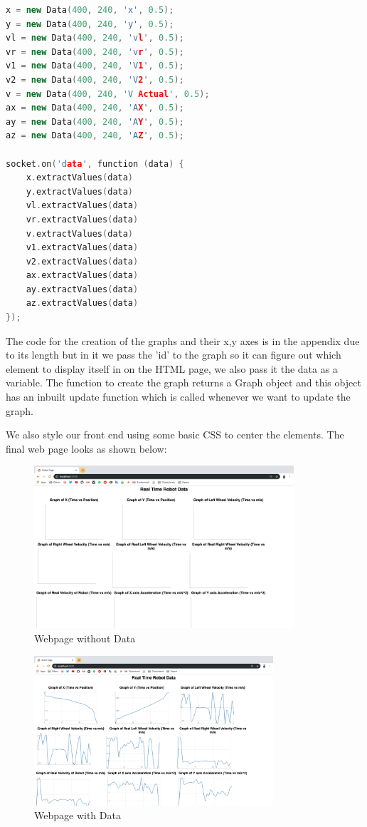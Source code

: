 \documentclass[conference]{IEEEtran}
\begin{document}
\begin{lstlisting}[language=C++, caption=Front End Data Listener]
x = new Data(400, 240, 'x', 0.5);
y = new Data(400, 240, 'y', 0.5);
vl = new Data(400, 240, 'vl', 0.5);
vr = new Data(400, 240, 'vr', 0.5);
v1 = new Data(400, 240, 'V1', 0.5);
v2 = new Data(400, 240, 'V2', 0.5);
v = new Data(400, 240, 'V Actual', 0.5);
ax = new Data(400, 240, 'AX', 0.5);
ay = new Data(400, 240, 'AY', 0.5);
az = new Data(400, 240, 'AZ', 0.5);

socket.on('data', function (data) {
    x.extractValues(data)
    y.extractValues(data)
    vl.extractValues(data)
    vr.extractValues(data)
    v.extractValues(data)
    v1.extractValues(data)
    v2.extractValues(data)
    ax.extractValues(data)
    ay.extractValues(data)
    az.extractValues(data)
});\end{lstlisting}

    The code for the creation of the graphs and their x,y axes is in the appendix due to its length but in it we pass the
    'id' to the graph so it can figure out which element to display itself in on the HTML page, we also pass it the data as a
    variable. The function to create the graph returns a Graph object and this object has an inbuilt update function which is called
    whenever we want to update the graph.

    We also style our front end using some basic CSS to center the elements. The final web page looks as shown below:

    \begin{figure}[H]
        \centering
        \captionsetup{justification=centering}
        \centering
        \includegraphics[width=3.8in]{15.png}
        \caption{Webpage without Data}  
        \label{6}
    \end{figure}

    \begin{figure}[H]
        \centering
        \captionsetup{justification=centering}
        \centering
        \includegraphics[width=3.5in]{16.png}
        \caption{Webpage with Data}  
        \label{6}
    \end{figure}
\end{document}
